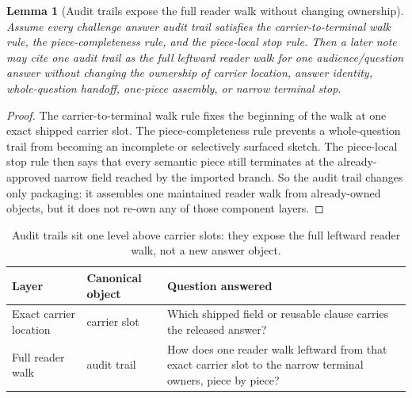 \documentclass[11pt]{article}
\newtheorem{lemma}{Lemma}
\begin{document}
\begin{lemma}[Audit trails expose the full reader walk without changing ownership]
Assume every challenge answer audit trail satisfies the carrier-to-terminal walk rule, the piece-completeness rule, and the piece-local stop rule.
Then a later note may cite one audit trail as the full leftward reader walk for one audience/question answer without changing the ownership of carrier location, answer identity, whole-question handoff, one-piece assembly, or narrow terminal stop.
\end{lemma}

\begin{proof}
The carrier-to-terminal walk rule fixes the beginning of the walk at one exact shipped carrier slot.
The piece-completeness rule prevents a whole-question trail from becoming an incomplete or selectively surfaced sketch.
The piece-local stop rule then says that every semantic piece still terminates at the already-approved narrow field reached by the imported branch.
So the audit trail changes only packaging: it assembles one maintained reader walk from already-owned objects, but it does not re-own any of those component layers.\qedhere
\end{proof}

\begin{table}[t]
\centering
\small
\begin{tabularx}{\linewidth}{@{}l l X@{}}
\toprule
Layer & Canonical object & Question answered \\
\midrule
Exact carrier location & carrier slot & Which shipped field or reusable clause carries the released answer? \\
Full reader walk & audit trail & How does one reader walk leftward from that exact carrier slot to the narrow terminal owners, piece by piece? \\
\bottomrule
\end{tabularx}
\caption{Audit trails sit one level above carrier slots: they expose the full leftward reader walk, not a new answer object.}
\label{tab:answeraudittrails}
\end{table}
\end{document}
